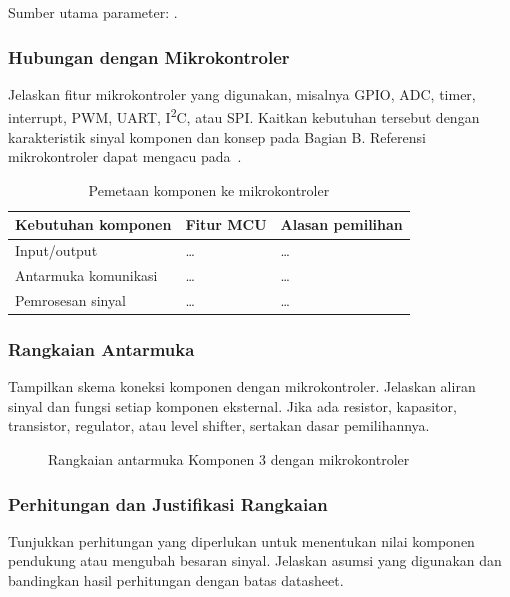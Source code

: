 Sumber utama parameter: \cite{datasheet}.

\subsubsection{Hubungan dengan Mikrokontroler}
Jelaskan fitur mikrokontroler yang digunakan, misalnya GPIO, ADC, timer,
interrupt, PWM, UART, I\textsuperscript{2}C, atau SPI. Kaitkan kebutuhan
tersebut dengan karakteristik sinyal komponen dan konsep pada Bagian B.
Referensi mikrokontroler dapat mengacu pada~\cite{mcu}.

\begin{table}[H]
\centering
\caption{Pemetaan komponen ke mikrokontroler}
\begin{tabularx}{\textwidth}{@{}lXX@{}}
\toprule
Kebutuhan komponen & Fitur MCU & Alasan pemilihan \\
\midrule
Input/output & \dots & \dots \\
Antarmuka komunikasi & \dots & \dots \\
Pemrosesan sinyal & \dots & \dots \\
\bottomrule
\end{tabularx}
\end{table}

\subsubsection{Rangkaian Antarmuka}
Tampilkan skema koneksi komponen dengan mikrokontroler. Jelaskan aliran
sinyal dan fungsi setiap komponen eksternal. Jika ada resistor, kapasitor,
transistor, regulator, atau level shifter, sertakan dasar pemilihannya.

\begin{figure}[H]
\centering
\caption{Rangkaian antarmuka Komponen 3 dengan mikrokontroler}
\label{fig:rangkaian-komponen-03}
\end{figure}

\subsubsection{Perhitungan dan Justifikasi Rangkaian}
Tunjukkan perhitungan yang diperlukan untuk menentukan nilai komponen
pendukung atau mengubah besaran sinyal. Jelaskan asumsi yang digunakan dan
bandingkan hasil perhitungan dengan batas datasheet.

